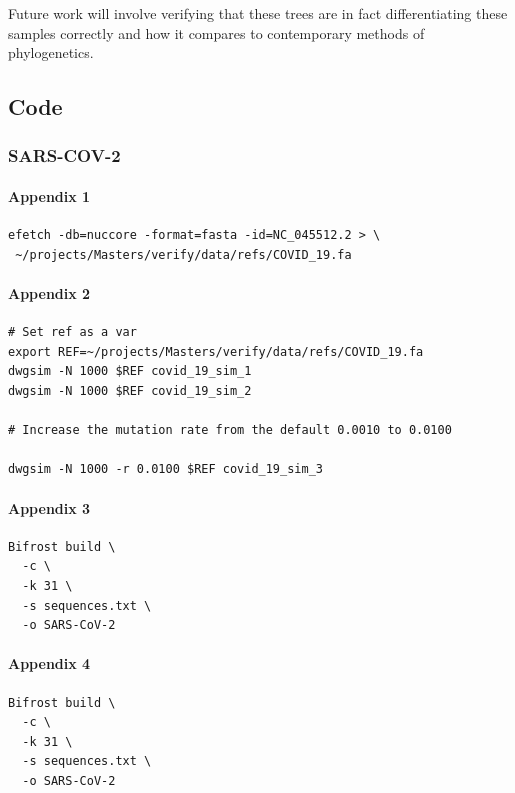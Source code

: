 \documentclass[10pt, a4paper]{article}
\begin{document}
Future work will involve verifying that these trees are in fact differentiating these samples correctly and how it compares to contemporary methods of phylogenetics.

\newpage



\begin{appendices}
\subsection{Code}
\label{sec:orge4b576e}
\subsubsection{SARS-COV-2}
\label{sec:orgcaaa451}
\paragraph{Appendix 1}
\label{sec:org67af541}
\begin{verbatim}
efetch -db=nuccore -format=fasta -id=NC_045512.2 > \
 ~/projects/Masters/verify/data/refs/COVID_19.fa
\end{verbatim}

\paragraph{Appendix 2}
\label{sec:org5b6f44f}
\begin{verbatim}
# Set ref as a var
export REF=~/projects/Masters/verify/data/refs/COVID_19.fa
dwgsim -N 1000 $REF covid_19_sim_1
dwgsim -N 1000 $REF covid_19_sim_2

# Increase the mutation rate from the default 0.0010 to 0.0100

dwgsim -N 1000 -r 0.0100 $REF covid_19_sim_3
\end{verbatim}


\paragraph{Appendix 3}
\label{sec:org6812c55}
\begin{verbatim}
Bifrost build \
  -c \
  -k 31 \
  -s sequences.txt \
  -o SARS-CoV-2
\end{verbatim}

\paragraph{Appendix 4}
\label{sec:orgc3fec22}
\begin{verbatim}
Bifrost build \
  -c \
  -k 31 \
  -s sequences.txt \
  -o SARS-CoV-2
\end{verbatim}


\end{appendices}
\end{document}

